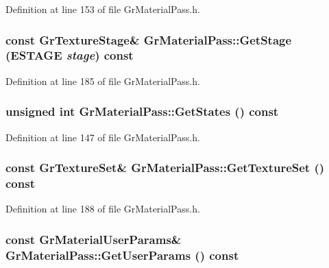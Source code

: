 Definition at line 153 of file GrMaterialPass.h.\hypertarget{class_gr_material_pass_40d16be22eb6d06342530acfdf487d87}{
\subsubsection[{GetStage}]{\setlength{\rightskip}{0pt plus 5cm}const {\bf GrTextureStage}\& GrMaterialPass::GetStage ({\bf ESTAGE} {\em stage}) const}}
\label{class_gr_material_pass_40d16be22eb6d06342530acfdf487d87}




Definition at line 185 of file GrMaterialPass.h.\hypertarget{class_gr_material_pass_241ea5e30cab7f74997a32b9479180e3}{
\subsubsection[{GetStates}]{\setlength{\rightskip}{0pt plus 5cm}unsigned int GrMaterialPass::GetStates () const}}
\label{class_gr_material_pass_241ea5e30cab7f74997a32b9479180e3}




Definition at line 147 of file GrMaterialPass.h.\hypertarget{class_gr_material_pass_d4fe8b412fb170dcf48688ba424c7d18}{
\subsubsection[{GetTextureSet}]{\setlength{\rightskip}{0pt plus 5cm}const {\bf GrTextureSet}\& GrMaterialPass::GetTextureSet () const}}
\label{class_gr_material_pass_d4fe8b412fb170dcf48688ba424c7d18}




Definition at line 188 of file GrMaterialPass.h.\hypertarget{class_gr_material_pass_2b6f9429348c2dcf6732174f60185b3c}{
\subsubsection[{GetUserParams}]{\setlength{\rightskip}{0pt plus 5cm}const {\bf GrMaterialUserParams}\& GrMaterialPass::GetUserParams () const}}
\label{class_gr_material_pass_2b6f9429348c2dcf6732174f60185b3c}




